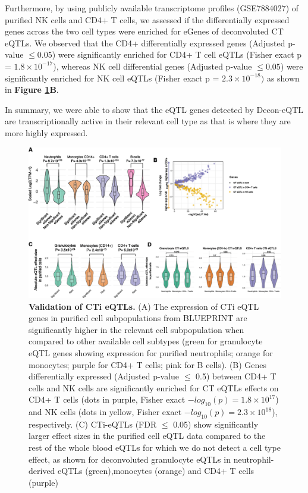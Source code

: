 Furthermore, by using publicly available transcriptome profiles (GSE7884027) of purified NK cells and CD4+ T cells, we assessed if the differentially expressed genes across the two cell types were enriched for eGenes of deconvoluted CT eQTLs. We observed that the CD4+ differentially expressed genes (Adjusted p-value $\leq 0.05$) were significantly enriched for CD4+ T cell eQTLs (Fisher exact p = $1.8 \times 10^{-17}$), whereas NK cell differential genes (Adjusted p-value $\leq 0.05$) were significantly enriched for NK cell eQTLs (Fisher exact p = $2.3 \times 10^{-18})$ as shown in \textbf{Figure \ref{decon_fig4}B}.

In summary, we were able to show that the eQTL genes detected by Decon-eQTL are transcriptionally active in their relevant cell type as that is where they are more highly expressed.

\begin{figure}[H]
	\includegraphics[width=\textwidth]{chapters/chapter4-deconvolution/img/fig4.png}
	\caption{\textbf{Validation of CTi eQTLs.} (A) The expression of CTi eQTL genes in purified cell subpopulations from BLUEPRINT\cite{adamsBLUEPRINTDecodeEpigenetic2012} are significantly higher in the relevant cell subpopulation when compared to other available cell subtypes (green for granulocyte eQTL genes showing expression for purified neutrophils; orange for monocytes; purple for CD4+ T cells; pink for B cells). (B) Genes differentially expressed (Adjusted p-value $\leq$ 0.5) between CD4+ T cells and NK cells are significantly enriched for CT eQTLs effects on CD4+ T cells (dots in purple, Fisher exact $-log_{10}(p) = 1.8 \times 10^{17}$) and NK cells (dots in yellow, Fisher exact $-log_{10}(p) = 2.3 \times 10^{18}$), respectively. (C) CTi-eQTLs (FDR $\leq$ 0.05) show significantly larger effect sizes in the purified cell eQTL data\cite{chenGeneticDriversEpigenetic2016} compared to the rest of the whole blood eQTLs for which we do not detect a cell type effect, as shown for deconvoluted granulocyte eQTLs in neutrophil-derived eQTLs (green),monocytes (orange) and CD4+ T cells (purple)}
	\label{decon_fig4}
\end{figure}


